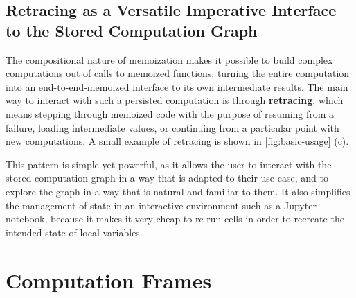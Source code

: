 \subsection{Retracing as a Versatile Imperative Interface to the Stored Computation Graph}
\label{subsection:retracing}

The compositional nature of memoization makes it possible to build complex
computations out of calls to memoized functions, turning the entire computation
into an end-to-end-memoized interface to its own intermediate results. The main
way to interact with such a persisted computation is through \textbf{retracing},
which means stepping through memoized code with the purpose of resuming from a
failure, loading intermediate values, or continuing from a particular point with
new computations. A small example of retracing is shown in \autoref{fig:basic-usage} (c).

This pattern is simple yet powerful, as it allows the user to interact with the
stored computation graph in a way that is adapted to their use case, and to
explore the graph in a way that is natural and familiar to them. It also
simplifies the management of state in an interactive environment such as a
Jupyter notebook, because it makes it very cheap to re-run cells in order to recreate the intended state of local variables.

\section{Computation Frames}
\label{section:cf}

